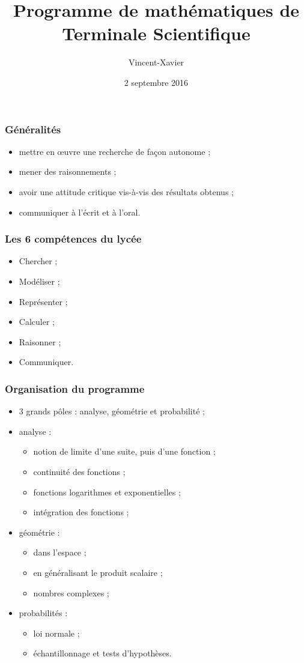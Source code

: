 \documentclass[frenchb]{beamer}
\title{Programme de mathématiques de Terminale Scientifique}
\author{Vincent-Xavier \bsc{Jumel}}
\institute{LaSalle Saint-Denis}
\date{2 septembre 2016}
\begin{document}
\begin{frame}
  \maketitle
\end{frame}

\begin{frame}
  \frametitle{Généralités}
  \begin{itemize}
    \item mettre en œuvre une recherche de façon autonome ;
    \item mener des raisonnements ;
    \item avoir une attitude critique vis-à-vis des résultats obtenus ;
    \item communiquer à l'écrit et à l'oral.
  \end{itemize}
\end{frame}

\begin{frame}
  \frametitle{Les 6 compétences du lycée}
  \begin{itemize}[<+->]
    \item Chercher ;
    \item Modéliser ;
    \item Représenter ;
    \item Calculer ;
    \item Raisonner ;
    \item Communiquer.
  \end{itemize}
\end{frame}

\begin{frame}
  \frametitle{Organisation du programme}
  \begin{itemize}[<+->]
    \item 3 grands pôles : analyse, géométrie et probabilité ;
    \item analyse :
      \begin{itemize}
        \item notion de limite d'une suite, puis d'une fonction ;
        \item continuité des fonctions ;
        \item fonctions logarithmes et exponentielles ;
        \item intégration des fonctions ;
      \end{itemize}
    \item géométrie :
      \begin{itemize}
        \item dans l'espace ;
        \item en généralisant le produit scalaire ;
        \item nombres complexes ;
      \end{itemize}
    \item probabilités :
      \begin{itemize}
        \item loi normale ;
        \item échantillonnage et tests d'hypothèses.
      \end{itemize}
  \end{itemize}
\end{frame}
\end{document}
